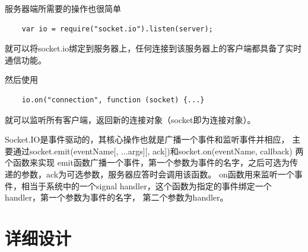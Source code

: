 \documentclass[11pt]{ctexart}
\begin{document}
服务器端所需要的操作也很简单
\begin{verbatim}
    var io = require("socket.io").listen(server);
\end{verbatim}
就可以将socket.io绑定到服务器上，任何连接到该服务器上的客户端都具备了实时通信功能。

然后使用
\begin{verbatim}
    io.on("connection", function (socket) {...}
\end{verbatim}
就可以监听所有客户端，返回新的连接对象（socket即为连接对象）。

Socket.IO是事件驱动的，其核心操作也就是广播一个事件和监听事件并相应，
主要通过\textsf{socket.emit(eventName[, ...args][, ack])}和\textsf{socket.on(eventName, callback)}
两个函数来实现
\textsf{emit}函数广播一个事件，第一个参数为事件的名字，之后可选为传递的参数，\textsf{ack}为可选参数，服务器应答时会调用该函数。
\textsf{on}函数用来监听一个事件，相当于系统中的一个signal handler，这个函数为指定的事件绑定一个handler，第一个参数为事件的名字，
第二个参数为handler。

\section{详细设计}
\end{document}
